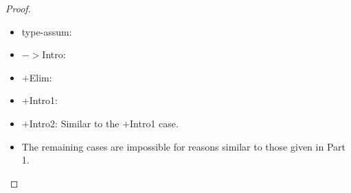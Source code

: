 \begin{proof}{}
  \begin{itemize}
  \item type-assum:
    
    \vspace*{4ex}

  \item $->$Intro:

    \vspace*{4ex}

  \item $+$Elim:

    \vspace*{4ex}

  \item $+$Intro1:

    \vspace*{20ex}

  \item $+$Intro2: Similar to the $+$Intro1 case.

  \item{} The remaining cases are impossible for reasons similar to those
    given in Part 1.
  \qedhere
  \end{itemize}


\end{proof}





